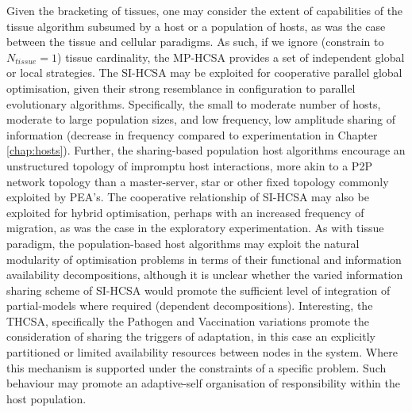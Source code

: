 Given the bracketing of tissues, one may consider the extent of capabilities of the tissue algorithm subsumed by a host or a population of hosts, as was the case between the tissue and cellular paradigms. As such, if we ignore (constrain to $N_{tissue}=1$) tissue cardinality, the MP-HCSA provides a set of independent global or local strategies. 
The SI-HCSA may be exploited for cooperative parallel global optimisation, given their strong resemblance in configuration to parallel evolutionary algorithms. Specifically, the small to moderate number of hosts, moderate to large population sizes, and low frequency, low amplitude sharing of information (decrease in frequency compared to experimentation in Chapter \ref{chap:hosts}). Further, the sharing-based population host algorithms encourage an unstructured topology of impromptu host interactions, more akin to a P2P network topology than a master-server, star or other fixed topology commonly exploited by PEA's. 
The cooperative relationship of SI-HCSA may also be exploited for hybrid optimisation, perhaps with an increased frequency of migration, as was the case in the exploratory experimentation. 
As with tissue paradigm, the population-based host algorithms may exploit the natural modularity of optimisation problems in terms of their functional and information availability decompositions, although it is unclear whether the varied information sharing scheme of SI-HCSA would promote the sufficient level of integration of partial-models where required (dependent decompositions). Interesting, the THCSA, specifically the Pathogen and Vaccination variations promote the consideration of sharing the triggers of adaptation, in this case an explicitly partitioned or limited availability resources between nodes in the system. Where this mechanism is supported under the constraints of a specific problem. Such behaviour may promote an adaptive-self organisation of responsibility within the host population. 

